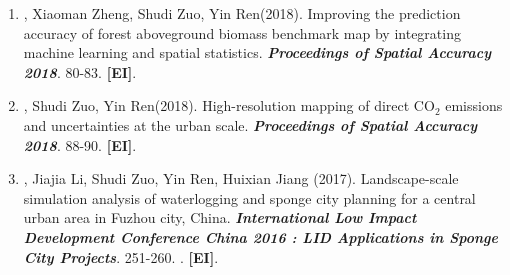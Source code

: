 \begin{enumerate}
\item
    \Shaoqing\CF, Xiaoman Zheng\CF, Shudi Zuo, Yin Ren\CS (2018).
    Improving the prediction accuracy of forest aboveground biomass benchmark map by integrating machine learning and spatial statistics.
    \textbf{\textit{Proceedings of Spatial Accuracy 2018}}. 80-83.
    \textbf{[EI]}.
\item
    \Shaoqing, Shudi Zuo, Yin Ren\CS (2018).
    High-resolution mapping of direct CO$_2$ emissions and uncertainties at the urban scale.
    \textbf{\textit{Proceedings of Spatial Accuracy 2018}}. 88-90.
    \textbf{[EI]}.
\item
    \Shaoqing, Jiajia Li, Shudi Zuo, Yin Ren\CS, Huixian Jiang (2017).
	Landscape-scale simulation analysis of waterlogging and sponge city planning for a central urban area in Fuzhou city, China.
    \textbf{\textit{International Low Impact Development Conference China 2016 : LID Applications in Sponge City Projects}}. 251-260.
    . 
    \textbf{[EI]}.

\end{enumerate}

